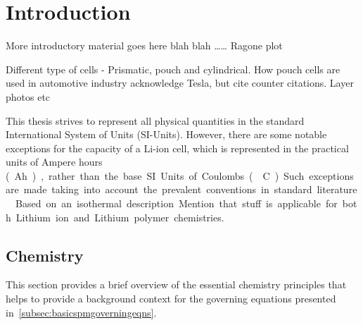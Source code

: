 
\clearpage
\chapter{Introduction}\label{ch:intro}

More introductory material goes here blah blah \dots \dots
Ragone plot

Different type of cells - Prismatic,  pouch and cylindrical. How pouch cells are
used in automotive industry acknowledge Tesla, but cite counter citations. Layer
photos etc

This  thesis  strives to  represent  all  physical  quantities in  the  standard
International  System  of Units  (SI-Units).  However,  there are  some  notable
exceptions \eg{} for the capacity of a  Li-ion cell, which is represented in the
practical units  of Ampere  hours (\SI{}Ah),  rather than the  base SI  Units of
Coulombs (\SI{}{\coulomb}).  Such exceptions  are made  taking into  account the
prevalent conventions in standard literature.




Based on an isothermal description
Mention  that stuff  is  applicable for  both Lithium  ion  and Lithium  polymer
chemistries.


\section{Chemistry}\label{subsec:liionchemistry}

This section  provides a  brief overview of  the essential  chemistry principles
that helps to provide a background context for the governing equations presented
in~\cref{subsec:basicspmgoverningeqns}.


